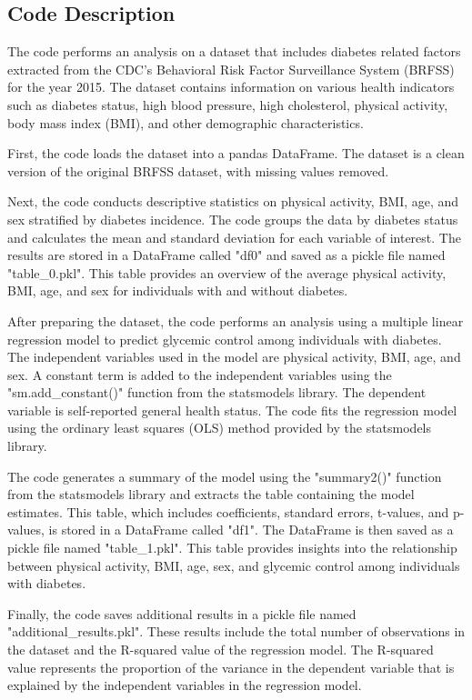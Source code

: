 \documentclass[11pt]{article}
\begin{document}
\subsection{Code Description}

The code performs an analysis on a dataset that includes diabetes related factors extracted from the CDC's Behavioral Risk Factor Surveillance System (BRFSS) for the year 2015. The dataset contains information on various health indicators such as diabetes status, high blood pressure, high cholesterol, physical activity, body mass index (BMI), and other demographic characteristics.

First, the code loads the dataset into a pandas DataFrame. The dataset is a clean version of the original BRFSS dataset, with missing values removed.

Next, the code conducts descriptive statistics on physical activity, BMI, age, and sex stratified by diabetes incidence. The code groups the data by diabetes status and calculates the mean and standard deviation for each variable of interest. The results are stored in a DataFrame called "df0" and saved as a pickle file named "table\_0.pkl". This table provides an overview of the average physical activity, BMI, age, and sex for individuals with and without diabetes.

After preparing the dataset, the code performs an analysis using a multiple linear regression model to predict glycemic control among individuals with diabetes. The independent variables used in the model are physical activity, BMI, age, and sex. A constant term is added to the independent variables using the "sm.add\_constant()" function from the statsmodels library. The dependent variable is self-reported general health status. The code fits the regression model using the ordinary least squares (OLS) method provided by the statsmodels library.

The code generates a summary of the model using the "summary2()" function from the statsmodels library and extracts the table containing the model estimates. This table, which includes coefficients, standard errors, t-values, and p-values, is stored in a DataFrame called "df1". The DataFrame is then saved as a pickle file named "table\_1.pkl". This table provides insights into the relationship between physical activity, BMI, age, sex, and glycemic control among individuals with diabetes.

Finally, the code saves additional results in a pickle file named "additional\_results.pkl". These results include the total number of observations in the dataset and the R-squared value of the regression model. The R-squared value represents the proportion of the variance in the dependent variable that is explained by the independent variables in the regression model.
\end{document}

